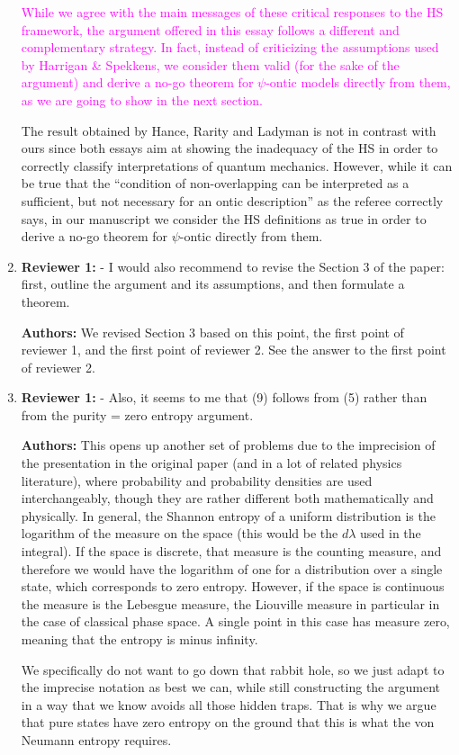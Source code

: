\documentclass[11pt, executivepaper]{article}
\begin{document}
\begin{enumerate}
\textcolor{magenta}{While we agree with the main messages of these critical responses to the HS framework, the argument offered in this essay follows a different and complementary strategy. In fact, instead of criticizing the assumptions used by Harrigan \& Spekkens, we consider them valid (for the sake of the argument) and derive a no-go theorem for $\psi$-ontic models directly from them, as we are going to show in the next section.}

The result obtained by Hance, Rarity and Ladyman is not in contrast with ours since both essays aim at showing the inadequacy of the HS in order to correctly classify interpretations of quantum mechanics. However, while it can be true that  the ``condition of non-overlapping can be interpreted as a sufficient, but not necessary for an ontic description'' as the referee correctly says, in our manuscript we consider the HS definitions as true in order to derive a no-go theorem for $\psi$-ontic directly from them.

\item \textbf{Reviewer 1:} - I would also recommend to revise the Section 3 of the paper: first, outline the argument and its assumptions, and then formulate a theorem.
\vspace{2mm}

\textbf{Authors:} We revised Section 3 based on this point, the first point of reviewer 1, and the first point of reviewer 2. See the answer to the first point of reviewer 2.

\item \textbf{Reviewer 1:}  - Also, it seems to me that (9) follows from (5) rather than from the purity = zero entropy argument.
\vspace{2mm}

\textbf{Authors:} This opens up another set of problems due to the imprecision of the presentation in the original paper (and in a lot of related physics literature), where probability and probability densities are used interchangeably, though they are rather different both mathematically and physically. In general, the Shannon entropy of a uniform distribution is the logarithm of the measure on the space (this would be the $d\lambda$ used in the integral). If the space is discrete, that measure is the counting measure, and therefore we would have the logarithm of one for a distribution over a single state, which corresponds to zero entropy. However, if the space is continuous the measure is the Lebesgue measure, the Liouville measure in particular in the case of classical phase space. A single point in this case has measure zero, meaning that the entropy is minus infinity.

We specifically do not want to go down that rabbit hole, so we just adapt to the imprecise notation as best we can, while still constructing the argument in a way that we know avoids all those hidden traps. That is why we argue that pure states have zero entropy on the ground that this is what the von Neumann entropy requires.


\end{enumerate}
 
\end{document}
